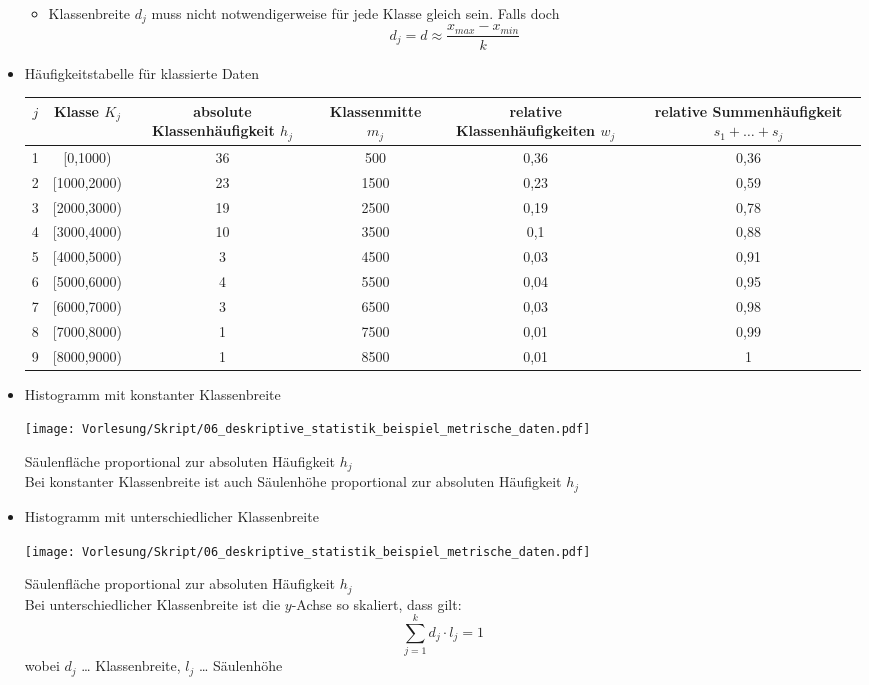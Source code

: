 \documentclass{scrreprt}
\begin{document}
\begin{itemize}
\begin{itemize}
\begin{itemize}
\end{itemize}
\item Klassenbreite $d_j$ muss nicht notwendigerweise für jede Klasse gleich sein. Falls doch
$$d_j = d \approx \frac{x_{max}-x_{min}}{k}$$
\end{itemize}
\item Häufigkeitstabelle für klassierte Daten\\
\begin{tabular}{c C{0.18} C{0.18} C{0.18} C{0.18} C{0.18}}
$j$ & Klasse $K_j$ & absolute Klassenhäufigkeit $h_j$ & Klassenmitte $m_j$ & relative Klassenhäufigkeiten $w_j$ & relative Summenhäufigkeit $s_1+\ldots + s_j$\\ & [0,1000) & 36 & 500 & 0,36 & 0,36\\
2 & [1000,2000) & 23 & 1500 & 0,23 & 0,59\\
3 & [2000,3000) & 19 & 2500 & 0,19 & 0,78\\
4 & [3000,4000) & 10 & 3500 & 0,1 & 0,88\\
5 & [4000,5000) & 3 & 4500 & 0,03 & 0,91\\
6 & [5000,6000) & 4 & 5500 & 0,04 & 0,95\\
7 & [6000,7000) & 3 & 6500 & 0,03 & 0,98\\
8 & [7000,8000) & 1 & 7500 & 0,01 & 0,99\\
9 & [8000,9000) & 1 & 8500 & 0,01 & 1\\
\end{tabular}
\item Histogramm mit konstanter Klassenbreite
\begin{center}
\texttt{[image: Vorlesung/Skript/06\_deskriptive\_statistik\_beispiel\_metrische\_daten.pdf]}
\end{center}
Säulenfläche proportional zur absoluten Häufigkeit $h_j$\\
Bei konstanter Klassenbreite ist auch Säulenhöhe proportional zur absoluten Häufigkeit $h_j$
\item Histogramm mit unterschiedlicher Klassenbreite
\begin{center}
\texttt{[image: Vorlesung/Skript/06\_deskriptive\_statistik\_beispiel\_metrische\_daten.pdf]}
\end{center}
Säulenfläche proportional zur absoluten Häufigkeit $h_j$\\
Bei unterschiedlicher Klassenbreite ist die $y$-Achse so skaliert, dass gilt:
$$\sum_{j=1}^k d_j \cdot l_j = 1$$
wobei $d_j$ … Klassenbreite, $l_j$ … Säulenhöhe
\end{itemize} 
\end{document}
